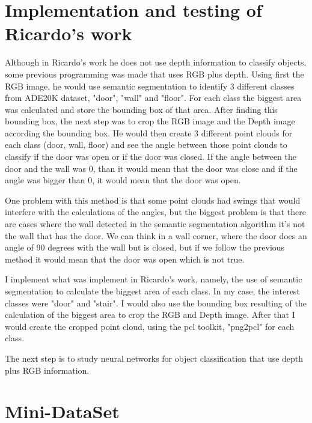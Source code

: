     

    \section{Implementation and testing of Ricardo's work}
        
    Although in Ricardo's work he does not use depth information to classify objects, some previous programming was made that uses RGB plus depth. Using first the RGB image, he would use semantic segmentation to identify 3 different classes from ADE20K dataset, "door", "wall" and "floor". For each class the biggest area was calculated and store the bounding box of that area. After finding this bounding box, the next step was to crop the RGB image and the Depth image according the bounding box. He would then create 3 different point clouds for each class (door, wall, floor) and see the angle between those point clouds to classify if the door was open or if the door was closed. If the angle between the door and the wall was 0, than it would mean that the door was close and if the angle was bigger than 0, it would mean that the door was open.
    
    \bigskip
    
    One problem with this method is that some point clouds had swings that would interfere with the calculations of the angles, but the biggest problem is that there are cases where the wall detected in the semantic segmentation algorithm it's not the wall that has the door. We can think in a wall corner, where the door does an angle of 90 degrees with the wall but is closed, but if we follow the previous method it would mean that the door was open which is not true.
    
    I implement what was implement in Ricardo's work, namely, the use of semantic segmentation to calculate the biggest area of each class. In my case, the interest classes were "door" and "stair". I would also use the bounding box resulting of the calculation of the biggest area to crop the RGB and Depth image. After that I would create the cropped point cloud, using the pcl toolkit, "png2pcl" for each class.
    
    \bigskip
    
    The next step is to study neural networks for object classification that use depth plus RGB information. 
        
        
    \section{Mini-DataSet}    
        
